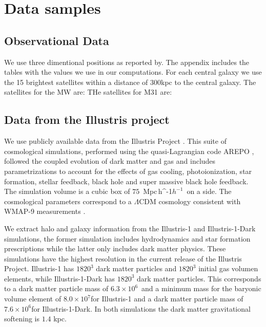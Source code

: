 \documentclass[a4paper,fleqn,usenatbib]{mnras}
\newcommand{\Mpch}{\,{\rm Mpc}\,\ifmmode h^{-1}\else $h^{-1}$\fi}
\newcommand{\Msun}{{\ifmmode{{\rm{M_{\odot}}}}\else{${\rm{M_{\odot}}}$}\fi}}
\begin{document}
\section{Data samples}

\subsection{Observational Data}
\label{sec:obs}

We use three dimentional positions as reported by. 
The appendix includes the tables with the values we use in our
computations.
For each central galaxy we use the 15 brightest satellites within a
distance of $300$kpc to the central galaxy.
The satellites for the MW are: 
THe satellites for M31 are:



\subsection{Data from the Illustris project}
\label{sec:illustris}

We use publicly available data from the Illustris Project 
\citep{2014MNRAS.444.1518V}. 
This suite of cosmological simulations, performed using the quasi-Lagrangian
code AREPO \citep{2010MNRAS.401..791S}, followed the coupled evolution of dark 
matter and gas and includes parametrizations to account for the effects of
gas cooling, photoionization, star formation, stellar feedback, black
hole and super massive black hole feedback. 
The simulation volume is a cubic box of $75$ \Mpch\ on a side.
The cosmological parameters correspond to a $\Lambda$CDM cosmology
consistent with WMAP-9 measurements \citep{2013ApJS..208...19H}. 

We extract halo and galaxy information from the Illustris-1 and
Illustris-1-Dark simulations, the former simulation includes
hydrodynamics and star formation prescriptions while the latter only
includes dark matter physics.
These simulations have the highest resolution in the current release of the
Illustris Project.
Illustris-1 has $1820^3$ dark matter particles and $1820^3$ initial gas
volumen elements, while Illustris-1-Dark has $1820^3$ dark matter particles.
This corresponds to a dark matter particle mass of
$6.3\times 10^6$\Msun\ and a minimum mass for the baryonic volume
element of $8.0\times 10^7$\Msun for Illustris-1 and a dark matter
particle mass of $7.6\times 10^6$\Msun for Illustris-1-Dark.
In both simulations the dark matter gravitational softening is $1.4$
kpc.
\end{document}
